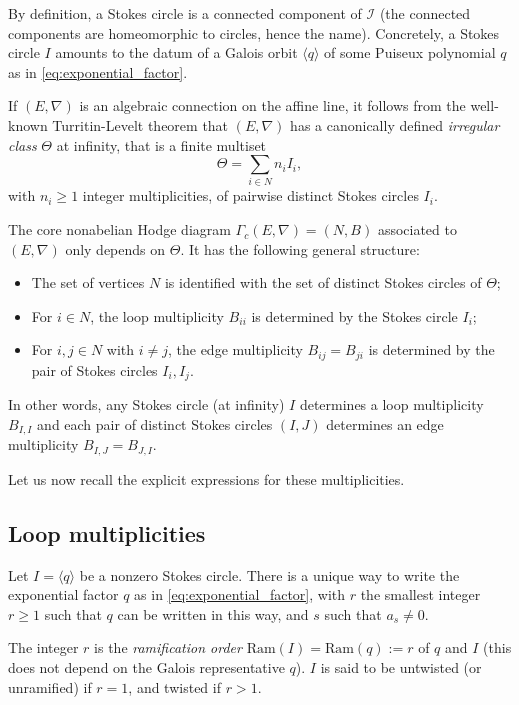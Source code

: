 \documentclass[11pt,a4paper]{amsart}
\numberwithin{equation}{section}
\newcommand{\cir}[1]{\langle #1 \rangle}
\begin{document}
By definition, a Stokes circle is a connected component of $\mathcal I$ (the connected components are homeomorphic to circles, hence the name). Concretely, a Stokes circle $I$ amounts to the datum of a Galois orbit $\cir{q}$ of some Puiseux polynomial $q$ as in \eqref{eq:exponential_factor}.



If $(E,\nabla)$ is an algebraic connection on the affine line, it follows from the well-known Turritin-Levelt theorem that $(E,\nabla)$ has a canonically defined \emph{irregular class} $\Theta$ at infinity, that is a finite multiset
\[
\Theta=\sum_{i\in N} n_i I_i,
\]
with $n_i\geq 1$ integer multiplicities, of pairwise distinct Stokes circles $I_i$.

The core nonabelian Hodge diagram $\Gamma_c(E,\nabla)=(N,B)$ associated to $(E,\nabla)$ only depends on $\Theta$. It has the following general structure:
\begin{itemize}
\item The set of vertices $N$ is identified with the set of distinct Stokes circles of $\Theta$; 
\item For $i\in N$, the loop multiplicity $B_{ii}$ is determined by the Stokes circle $I_i$;
\item For $i,j\in N$ with $i\neq j$, the edge multiplicity $B_{ij}=B_{ji}$ is determined by the pair of Stokes circles $I_i,I_j$.
\end{itemize}

In other words, any Stokes circle (at infinity) $I$ determines a loop multiplicity $B_{I,I}$ and each pair of distinct Stokes circles $(I,J)$ determines an edge multiplicity $B_{I,J}=B_{J,I}$. 

Let us now recall the explicit expressions for these multiplicities.



\subsection{Loop multiplicities}

Let $I=\cir{q}$ be a nonzero Stokes circle. There is a unique way to write the exponential factor $q$ as in \eqref{eq:exponential_factor}, with $r$ the smallest integer $r\geq 1$ such that $q$ can be written in this way, and $s$ such that $a_s\neq 0$.



The integer $r$ is the \emph{ramification order} $\mathrm{Ram}(I)=\mathrm{Ram}(q):=r$ of $q$ and $I$ (this does not depend on the Galois representative $q$). $I$ is said to be untwisted (or unramified) if $r=1$, and twisted if $r>1$. 
\end{document}
